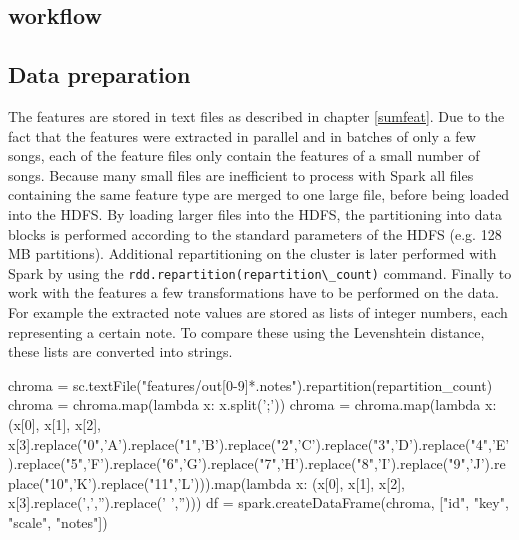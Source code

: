 \subsection{workflow}

\begin{figure}[htbp]
	\centering
\end{figure}
\FloatBarrier

\subsection{Data preparation}

The features are stored in text files as described in chapter \ref{sumfeat}. Due to the fact that the features were extracted in parallel and in batches of only a few songs, each of the feature files only contain the features of a small number of songs. Because many small files are inefficient to process with Spark \cite[p. 153]{sparkbook1} all files containing the same feature type are merged to one large file, before being loaded into the HDFS. By loading larger files into the HDFS, the partitioning into data blocks is performed according to the standard parameters of the HDFS (e.g. 128 MB partitions). Additional repartitioning on the cluster is later performed with Spark by using the \lstinline{rdd.repartition(repartition\_count)} command. 
Finally to work with the features a few transformations have to be performed on the data. For example the extracted note values are stored as lists of integer numbers, each representing a certain note. To compare these using the Levenshtein distance, these lists are converted into strings. 

\begin{pythonCode}[frame=single,label={lst:prep1},caption={notes preprocessing},captionpos=b]
chroma = sc.textFile("features/out[0-9]*.notes").repartition(repartition_count)
chroma = chroma.map(lambda x: x.split(';'))
chroma = chroma.map(lambda x: (x[0], x[1], x[2], x[3].replace("0",'A').replace("1",'B').replace("2",'C').replace("3",'D').replace("4",'E').replace("5",'F').replace("6",'G').replace("7",'H').replace("8",'I').replace("9",'J').replace("10",'K').replace("11",'L'))).map(lambda x: (x[0], x[1], x[2], x[3].replace(',','').replace(' ','')))
df = spark.createDataFrame(chroma, ["id", "key", "scale", "notes"])
\end{pythonCode}

